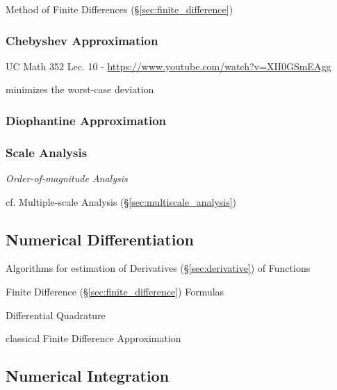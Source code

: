 \fist Method of Finite Differences (\S\ref{sec:finite_difference})



\subsubsection{Chebyshev Approximation}\label{sec:chebyshev_approximation}

UC Math 352 Lec. 10 - \url{https://www.youtube.com/watch?v=XII0GSmEAgg}

minimizes the worst-case deviation



\subsubsection{Diophantine Approximation}\label{sec:diophantine_approximation}

\subsubsection{Scale Analysis}\label{sec:scale_analysis}

\emph{Order-of-magnitude Analysis}

cf. Multiple-scale Analysis (\S\ref{sec:multiscale_analysis})



\subsection{Numerical Differentiation}\label{sec:numerical_differentiation}

Algorithms for estimation of Derivatives (\S\ref{sec:derivative}) of Functions

Finite Difference (\S\ref{sec:finite_difference}) Formulas

Differential Quadrature

classical Finite Difference Approximation



\subsection{Numerical Integration}\label{sec:numerical_integration}

